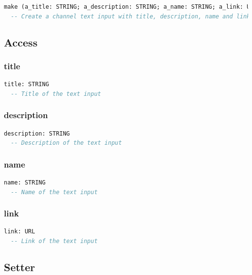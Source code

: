 \begin{lstlisting}[language=Eiffel]
make (a_title: STRING; a_description: STRING; a_name: STRING; a_link: URL)
  -- Create a channel text input with title, description, name and link
\end{lstlisting}

\subsection{Access}
\label{sec:channel-text-input-access}

\subsubsection{title}

\begin{lstlisting}[language=Eiffel]
title: STRING
  -- Title of the text input
\end{lstlisting}

\subsubsection{description}

\begin{lstlisting}[language=Eiffel]
description: STRING
  -- Description of the text input
\end{lstlisting}

\subsubsection{name}

\begin{lstlisting}[language=Eiffel]
name: STRING
  -- Name of the text input
\end{lstlisting}

\subsubsection{link}

\begin{lstlisting}[language=Eiffel]
link: URL
  -- Link of the text input
\end{lstlisting}

\subsection{Setter}
\label{sec:channel-text-input-setter}

